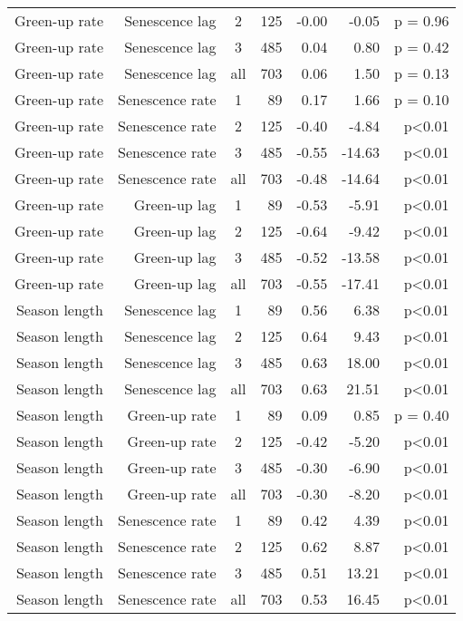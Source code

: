 \begin{table}[H]
\begin{tabular}{rrcrrrr}
  Green-up rate & Senescence lag & 2 & 125 & -0.00 & -0.05 & p = 0.96 \\ 
  Green-up rate & Senescence lag & 3 & 485 & 0.04 & 0.80 & p = 0.42 \\ 
  Green-up rate & Senescence lag & all & 703 & 0.06 & 1.50 & p = 0.13 \\ 
   \hline
Green-up rate & Senescence rate & 1 &  89 & 0.17 & 1.66 & p = 0.10 \\ 
  Green-up rate & Senescence rate & 2 & 125 & -0.40 & -4.84 & p<0.01 \\ 
  Green-up rate & Senescence rate & 3 & 485 & -0.55 & -14.63 & p<0.01 \\ 
  Green-up rate & Senescence rate & all & 703 & -0.48 & -14.64 & p<0.01 \\ 
   \hline
Green-up rate & Green-up lag & 1 &  89 & -0.53 & -5.91 & p<0.01 \\ 
  Green-up rate & Green-up lag & 2 & 125 & -0.64 & -9.42 & p<0.01 \\ 
  Green-up rate & Green-up lag & 3 & 485 & -0.52 & -13.58 & p<0.01 \\ 
  Green-up rate & Green-up lag & all & 703 & -0.55 & -17.41 & p<0.01 \\ 
   \hline
Season length & Senescence lag & 1 &  89 & 0.56 & 6.38 & p<0.01 \\ 
  Season length & Senescence lag & 2 & 125 & 0.64 & 9.43 & p<0.01 \\ 
  Season length & Senescence lag & 3 & 485 & 0.63 & 18.00 & p<0.01 \\ 
  Season length & Senescence lag & all & 703 & 0.63 & 21.51 & p<0.01 \\ 
   \hline
Season length & Green-up rate & 1 &  89 & 0.09 & 0.85 & p = 0.40 \\ 
  Season length & Green-up rate & 2 & 125 & -0.42 & -5.20 & p<0.01 \\ 
  Season length & Green-up rate & 3 & 485 & -0.30 & -6.90 & p<0.01 \\ 
  Season length & Green-up rate & all & 703 & -0.30 & -8.20 & p<0.01 \\ 
   \hline
Season length & Senescence rate & 1 &  89 & 0.42 & 4.39 & p<0.01 \\ 
  Season length & Senescence rate & 2 & 125 & 0.62 & 8.87 & p<0.01 \\ 
  Season length & Senescence rate & 3 & 485 & 0.51 & 13.21 & p<0.01 \\ 
  Season length & Senescence rate & all & 703 & 0.53 & 16.45 & p<0.01 \\ 

\end{tabular}
\end{table}
